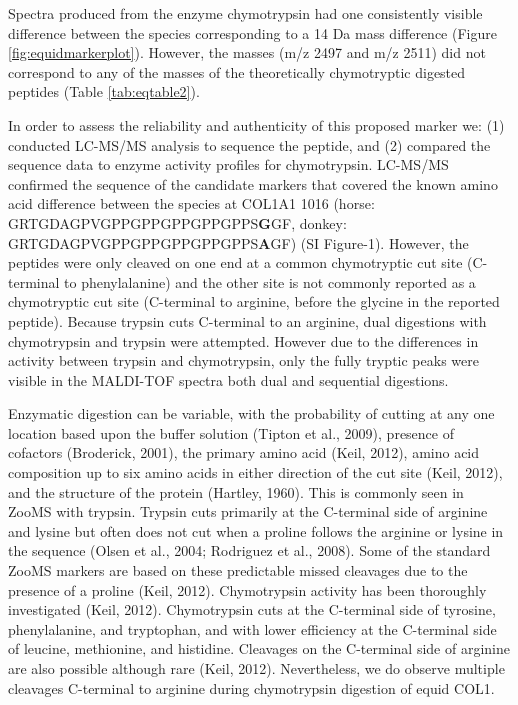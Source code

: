 \documentclass[preprint, 3p, authoryear]{elsarticle} %
\begin{document}
Spectra produced from the enzyme chymotrypsin had one consistently visible difference between the species corresponding to a 14 Da mass difference (Figure \ref{fig:equidmarkerplot}). However, the masses (m/z 2497 and m/z 2511) did not correspond to any of the masses of the theoretically chymotryptic digested peptides (Table \ref{tab:eqtable2}).

In order to assess the reliability and authenticity of this proposed marker we: (1) conducted LC-MS/MS analysis to sequence the peptide, and (2) compared the sequence data to enzyme activity profiles for chymotrypsin. LC-MS/MS confirmed the sequence of the candidate markers that covered the known amino acid difference between the species at COL1A1 1016 (horse: GRTGDAGPVGPPGPPGPPGPPGPPS\textbf{G}GF, donkey: GRTGDAGPVGPPGPPGPPGPPGPPS\textbf{A}GF) (SI Figure-1). However, the peptides were only cleaved on one end at a common chymotryptic cut site (C-terminal to phenylalanine) and the other site is not commonly reported as a chymotryptic cut site (C-terminal to arginine, before the glycine in the reported peptide). Because trypsin cuts C-terminal to an arginine, dual digestions with chymotrypsin and trypsin were attempted. However due to the differences in activity between trypsin and chymotrypsin, only the fully tryptic peaks were visible in the MALDI-TOF spectra both dual and sequential digestions.

Enzymatic digestion can be variable, with the probability of cutting at any one location based upon the buffer solution (Tipton et al., 2009), presence of cofactors (Broderick, 2001), the primary amino acid (Keil, 2012), amino acid composition up to six amino acids in either direction of the cut site (Keil, 2012), and the structure of the protein (Hartley, 1960). This is commonly seen in ZooMS with trypsin. Trypsin cuts primarily at the C-terminal side of arginine and lysine but often does not cut when a proline follows the arginine or lysine in the sequence (Olsen et al., 2004; Rodriguez et al., 2008). Some of the standard ZooMS markers are based on these predictable missed cleavages due to the presence of a proline (Keil, 2012). Chymotrypsin activity has been thoroughly investigated (Keil, 2012). Chymotrypsin cuts at the C-terminal side of tyrosine, phenylalanine, and tryptophan, and with lower efficiency at the C-terminal side of leucine, methionine, and histidine. Cleavages on the C-terminal side of arginine are also possible although rare (Keil, 2012). Nevertheless, we do observe multiple cleavages C-terminal to arginine during chymotrypsin digestion of equid COL1.
\end{document}
